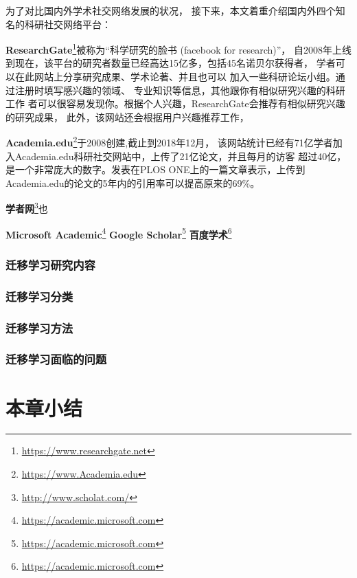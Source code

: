 为了对比国内外学术社交网络发展的状况，
接下来，本文着重介绍国内外四个知名的科研社交网络平台：%

\textbf{ResearchGate}\footnote{\url{https://www.researchgate.net}}被称为“科学研究的脸书%
(facebook for research)”，%
自2008年上线到现在，该平台的研究者数量已经高达15亿多，包括45名诺贝尔获得者，
学者可以在此网站上分享研究成果、学术论著、并且也可以%
加入一些科研论坛小组。通过注册时填写感兴趣的领域、%
专业知识等信息，其他跟你有相似研究兴趣的科研工作%
者可以很容易发现你。根据个人兴趣，ResearchGate会推荐有相似研究兴趣的研究成果，%
此外，该网站还会根据用户兴趣推荐工作，%

\textbf{Academia.edu}\footnote{\url{https://www.Academia.edu}}于2008创建,截止到2018年12月，%
该网站统计已经有71亿学者加入Academia.edu科研社交网站中，上传了21亿论文，并且每月的访客%
超过40亿，是一个非常庞大的数字。发表在PLOS
ONE上的一篇文章表示，上传到Academia.edu的论文的5年内的引用率可以提高原来的69\%。


\textbf{学者网}\footnote{\url{http://www.scholat.com/}}也%


\textbf{Microsoft Academic}\footnote{\url{https://academic.microsoft.com}}
\textbf{Google Scholar}\footnote{\url{https://academic.microsoft.com}}
\textbf{百度学术}\footnote{\url{https://academic.microsoft.com}}

\subsubsection{迁移学习研究内容}


\subsubsection{迁移学习分类}

\subsubsection{迁移学习方法}

\subsubsection{迁移学习面临的问题}

\section{本章小结}

